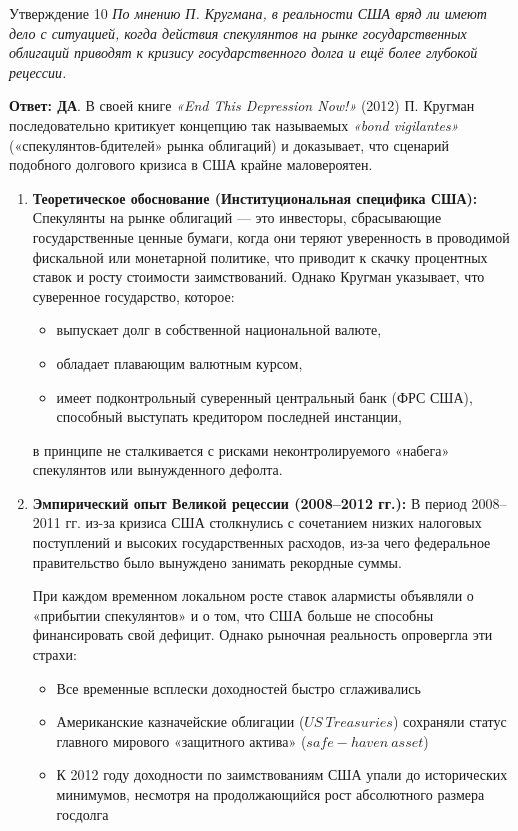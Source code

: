 \documentclass[10pt,a4paper]{article}
\newcommand{\qda}{\textbf{\color{yesgreen}Ответ: ДА}}
\newenvironment{answer}[2]{%
  \begin{qbox}{Утверждение #1}
  \textit{#2}\par\smallskip
}{%
  \end{qbox}\vspace{2pt}
}
\begin{document}
\begin{answer}{10}{По мнению П. Кругмана, в реальности США вряд ли имеют дело с ситуацией, когда действия спекулянтов на рынке государственных облигаций приводят к кризису государственного долга и ещё более глубокой рецессии.}
\qda. В своей книге \textit{«End This Depression Now!»} (2012) П. Кругман последовательно критикует концепцию так называемых \textit{«bond vigilantes»} («спекулянтов-бдителей» рынка облигаций) и доказывает, что сценарий подобного долгового кризиса в США крайне маловероятен.

\begin{enumerate}
    \item \textbf{Теоретическое обоснование (Институциональная специфика США):}
    Спекулянты на рынке облигаций — это инвесторы, сбрасывающие государственные ценные бумаги, когда они теряют уверенность в проводимой фискальной или монетарной политике, что приводит к скачку процентных ставок и росту стоимости заимствований. Однако Кругман указывает, что суверенное государство, которое:
    \begin{itemize}
        \item выпускает долг в собственной национальной валюте,
        \item обладает плавающим валютным курсом,
        \item имеет подконтрольный суверенный центральный банк (ФРС США), способный выступать кредитором последней инстанции,
    \end{itemize}
    в принципе не сталкивается с рисками неконтролируемого «набега» спекулянтов или вынужденного дефолта.

    \item \textbf{Эмпирический опыт Великой рецессии (2008–2012 гг.):}
    В период 2008–2011 гг. из-за кризиса США столкнулись с сочетанием низких налоговых поступлений и высоких государственных расходов, из-за чего федеральное правительство было вынуждено занимать рекордные суммы. 
    
    При каждом временном локальном росте ставок алармисты объявляли о «прибытии спекулянтов» и о том, что США больше не способны финансировать свой дефицит. Однако рыночная реальность опровергла эти страхи:
    \begin{itemize}
        \item Все временные всплески доходностей быстро сглаживались 
        \item Американские казначейские облигации ($US\ Treasuries$) сохраняли статус главного мирового «защитного актива» ($safe-haven\ asset$)
        \item К 2012 году доходности по заимствованиям США упали до исторических минимумов, несмотря на продолжающийся рост абсолютного размера госдолга
    \end{itemize}


\end{enumerate}
\end{answer}
\end{document}
